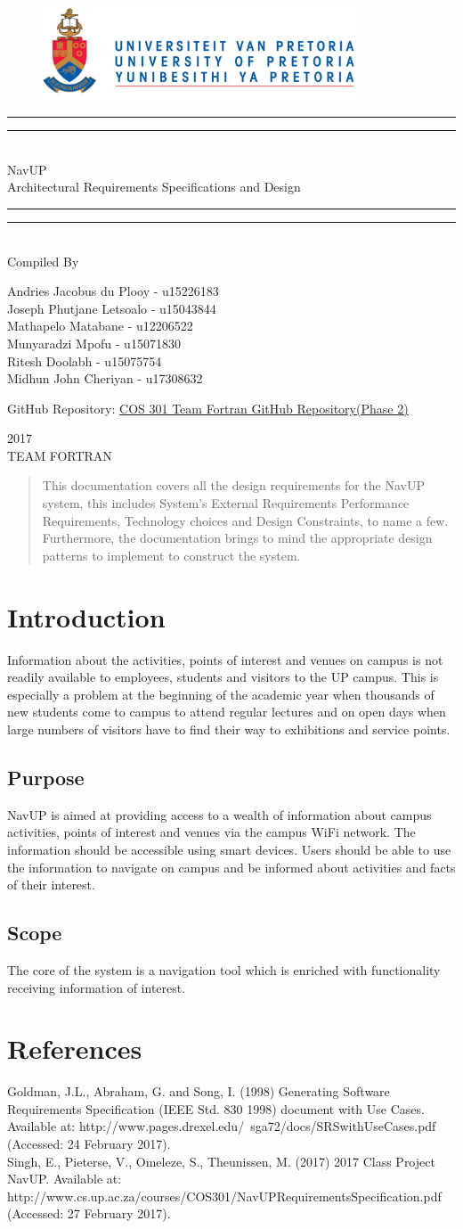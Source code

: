 \documentclass{article}
\newcommand*{\titleGP}{\begingroup
		\begin{figure}[t]
			\centering
			\includegraphics[width=350px]{UP_Logo.PNG}
		\end{figure}
\centering 
\vspace*{\baselineskip}

\rule{\textwidth}{1.6pt}\vspace*{-\baselineskip}\vspace*{2pt}
\rule{\textwidth}{0.4pt}\\[\baselineskip]

{\LARGE NavUP\\ [0.3\baselineskip] Architectural Requirements Specifications and Design } \\ [0.2\baselineskip]
\rule{\textwidth}{0.4pt}\vspace*{-\baselineskip}\vspace{3.2pt}
\rule{\textwidth}{1.6pt}\\[\baselineskip] %



Compiled By \\[\baselineskip]
{\Large Andries Jacobus du Plooy - u15226183 \\ Joseph Phutjane Letsoalo - u15043844 \\ Mathapelo Matabane - u12206522 \\ Munyaradzi Mpofu - u15071830\\ Ritesh Doolabh - u15075754 \\ Midhun John Cheriyan - u17308632\par}

\bigskip
\bigskip

 	GitHub Repository:  
 	\href{https://github.com/RitzDoolabh/COS301-Team_Fortran}{COS 301 Team Fortran GitHub Repository(Phase 2)}




 

\vfill


{\scshape 2017} \\[0.3\baselineskip]
{\large TEAM FORTRAN}\par

\endgroup}
\begin{document}
\titleGP
\newpage


\begin{abstract}
\noindent This documentation covers all the design requirements for the NavUP system, this includes System's External Requirements Performance Requirements, Technology choices and Design Constraints, to name a few. Furthermore, the documentation brings to mind the appropriate design patterns to implement to construct the system.
\end{abstract}

\newpage
\tableofcontents

\newpage
\section{Introduction}
Information about the activities, points of interest and venues on campus is not
readily available to employees, students and visitors to the UP campus. This is
especially a problem at the beginning of the academic year when thousands of new
students come to campus to attend regular lectures and on open days when large
numbers of visitors have to find their way to exhibitions and service points.

\subsection{Purpose}
NavUP is aimed at providing access to a wealth of information about campus
activities, points of interest and venues via the campus WiFi network. The information
should be accessible using smart devices. Users should be able to use the
information to navigate on campus and be informed about activities and facts of their
interest.
\subsection{Scope}
The core of the system is a navigation tool which is enriched with functionality
receiving information of interest.

\section{References}
Goldman, J.L., Abraham, G. and Song, I. (1998) Generating Software Requirements Specification (IEEE Std. 830 1998) document with Use Cases. Available at: http://www.pages.drexel.edu/~sga72/docs/SRSwithUseCases.pdf (Accessed: 24 February 2017).\\
\noindent Singh, E., Pieterse, V., Omeleze, S., Theunissen, M. (2017) 2017 Class Project NavUP. Available at: http://www.cs.up.ac.za/courses/COS301/NavUPRequirementsSpecification.pdf (Accessed: 27 February 2017).\\ 
\newpage
\end{document}
